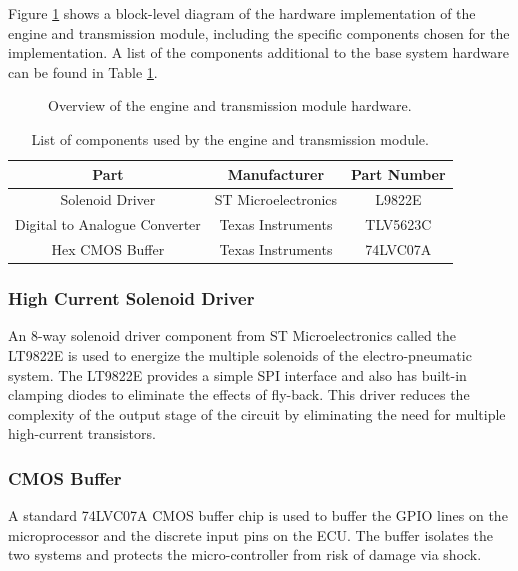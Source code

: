 Figure \ref{fig:engine_system_overview} shows a block-level diagram of the hardware implementation of the engine and transmission module, including the specific components chosen for the implementation. A list of the components additional to the base system hardware can be found in Table \ref{tab:engine_transmission_module_components}.

\begin{figure}[H]
\centering

\caption{Overview of the engine and transmission module hardware.}
\label{fig:engine_system_overview}
\end{figure}

\begin{table}[H]
  \caption{List of components used by the engine and transmission module.}
  \centering
  \begin{tabular}{|c|c|c|}
    \hline 
    Part & Manufacturer & Part Number\tabularnewline 
    \hline \hline
    Solenoid Driver & ST Microelectronics & L9822E \tabularnewline
    \hline
    Digital to Analogue Converter & Texas Instruments & TLV5623C \tabularnewline
    \hline
    Hex CMOS Buffer & Texas Instruments & 74LVC07A \tabularnewline
    \hline
  \end{tabular}
  \label{tab:engine_transmission_module_components}
\end{table}

\subsubsection{High Current Solenoid Driver}

An 8-way solenoid driver component from ST Microelectronics called the LT9822E is used to energize the multiple solenoids of the electro-pneumatic system. The LT9822E provides a simple SPI interface and also has built-in clamping diodes to eliminate the effects of fly-back. This driver reduces the complexity of the output stage of the circuit by eliminating the need for multiple high-current transistors.

\subsubsection{CMOS Buffer}

A standard 74LVC07A CMOS buffer chip is used to buffer the GPIO lines on the microprocessor and the discrete input pins on the ECU. The buffer isolates the two systems and protects the micro-controller from risk of damage via shock.

